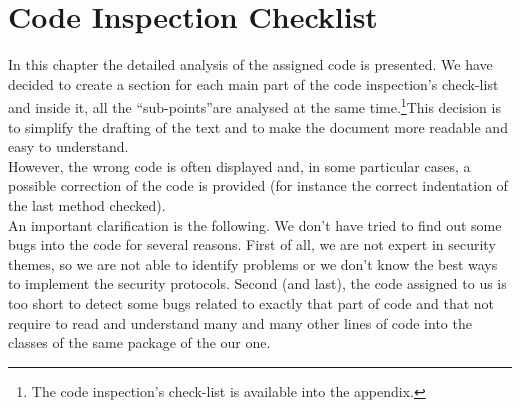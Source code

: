 \documentclass[\mainpath/main]{subfiles}
\begin{document}
\chapter{Code Inspection Checklist} %
\label{CodeInspectionChecklist}

\setmyfancystyle

In this chapter the detailed analysis of the assigned code is presented. We have decided to create a section for each main part of the code inspection's check-list and inside it, all the \textquotedblleft sub-points\textquotedblright are analysed at the same time.\footnote{The code inspection's check-list is available into the appendix.}This decision is to simplify the drafting of the text and to make the document more readable and easy to understand.\\
However, the wrong code is often displayed and, in some particular cases, a possible correction of the code is provided (for instance the correct indentation of the last method checked).\\
An important clarification is the following. We don't have tried to find out some bugs into the code for several reasons. First of all, we are not expert in security themes, so we are not able to identify problems or we don't know the best ways to implement the security protocols. Second (and last), the code assigned to us is too short to detect some bugs related to exactly that part of code and that not require to read and understand many and many other lines of code into the classes of the same package of the our one.\\
\end{document}
